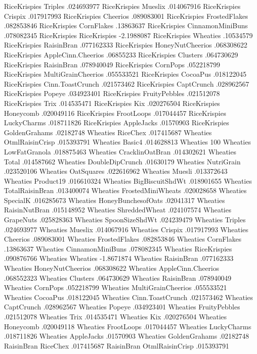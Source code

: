 RiceKrispies	Triples	.024693977
RiceKrispies	Mueslix	.014067916
RiceKrispies	Crispix	.017917993
RiceKrispies	Cheerios	.089083001
RiceKrispies	FrostedFlakes	.082853846
RiceKrispies	CornFlakes	.13863637
RiceKrispies	CinnamonMiniBuns	.078082345
RiceKrispies	RiceKrispies	-2.1988087
RiceKrispies	Wheaties	.10534579
RiceKrispies	RaisinBran	.077162333
RiceKrispies	HoneyNutCheerios	.068308622
RiceKrispies	AppleCinn.Cheerios	.06855233
RiceKrispies	Clusters	.064730629
RiceKrispies	RaisinBran	.078940049
RiceKrispies	CornPops	.052218799
RiceKrispies	MultiGrainCheerios	.055533521
RiceKrispies	CocoaPus	.018122045
RiceKrispies	Cinn.ToastCrunch	.021573462
RiceKrispies	CaptCrunch	.028962567
RiceKrispies	Popeye	.034923401
RiceKrispies	FruityPebbles	.021512078
RiceKrispies	Trix	.014535471
RiceKrispies	Kix	.020276504
RiceKrispies	Honeycomb	.020049116
RiceKrispies	FrootLoops	.017044457
RiceKrispies	LuckyCharms	.018711826
RiceKrispies	AppleJacks	.01570903
RiceKrispies	GoldenGrahams	.02182748
Wheaties	RiceChex	.017415687
Wheaties	OtmlRaisinCrisp	.015393791
Wheaties	Basic4	.014628813
Wheaties	100%
Wheaties	LowFatGranola	.018875463
Wheaties	CracklinOatBran	.014302621
Wheaties	Total	.014587662
Wheaties	DoubleDipCrunch	.01630179
Wheaties	NutriGrain	.023520106
Wheaties	OatSquares	.022616962
Wheaties	Muesli	.013372643
Wheaties	Product19	.016610324
Wheaties	BigBiscuitShdWt	.018901655
Wheaties	TotalRaisinBran	.013400074
Wheaties	FrostedMiniWheats	.020028658
Wheaties	SpecialK	.016285673
Wheaties	HoneyBunchesofOats	.02041317
Wheaties	RaisinNutBran	.015148952
Wheaties	ShreddedWheat	.024107574
Wheaties	GrapeNuts	.025828363
Wheaties	SpoonSizeShdWt	.024239479
Wheaties	Triples	.024693977
Wheaties	Mueslix	.014067916
Wheaties	Crispix	.017917993
Wheaties	Cheerios	.089083001
Wheaties	FrostedFlakes	.082853846
Wheaties	CornFlakes	.13863637
Wheaties	CinnamonMiniBuns	.078082345
Wheaties	RiceKrispies	.090876766
Wheaties	Wheaties	-1.8671874
Wheaties	RaisinBran	.077162333
Wheaties	HoneyNutCheerios	.068308622
Wheaties	AppleCinn.Cheerios	.068552323
Wheaties	Clusters	.064730629
Wheaties	RaisinBran	.078940049
Wheaties	CornPops	.052218799
Wheaties	MultiGrainCheerios	.055533521
Wheaties	CocoaPus	.018122045
Wheaties	Cinn.ToastCrunch	.021573462
Wheaties	CaptCrunch	.028962567
Wheaties	Popeye	.034923401
Wheaties	FruityPebbles	.021512078
Wheaties	Trix	.014535471
Wheaties	Kix	.020276504
Wheaties	Honeycomb	.020049118
Wheaties	FrootLoops	.017044457
Wheaties	LuckyCharms	.018711826
Wheaties	AppleJacks	.01570903
Wheaties	GoldenGrahams	.02182748
RaisinBran	RiceChex	.017415687
RaisinBran	OtmlRaisinCrisp	.015393791
